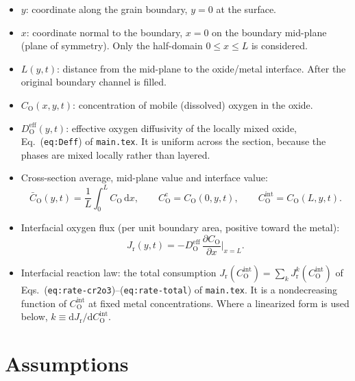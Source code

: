 \documentclass[12pt]{article}
\newcommand{\eff}{\mathrm{eff}}
\newcommand{\intf}{\mathrm{int}}
\newcommand{\Ox}{\mathrm{O}}
\newcommand{\D}{D_{\Ox}^{\eff}}
\newcommand{\Cb}{\bar{C}_{\Ox}}
\newcommand{\Cc}{C_{\Ox}^{\mathrm{c}}}
\newcommand{\Ci}{C_{\Ox}^{\intf}}
\newcommand{\Jr}{J_{\mathrm{r}}}
\newcommand{\dd}{\mathrm{d}}
\begin{document}
\begin{itemize}
  \item $y$: coordinate along the grain boundary, $y=0$ at the surface.
  \item $x$: coordinate normal to the boundary, $x=0$ on the boundary mid-plane
        (plane of symmetry). Only the half-domain $0\le x\le L$ is considered.
  \item $L(y,t)$: distance from the mid-plane to the oxide/metal interface. After the original boundary channel is filled.
  \item $C_{\Ox}(x,y,t)$: concentration of mobile (dissolved) oxygen in the oxide.
  \item $\D(y,t)$: effective oxygen diffusivity of the locally mixed oxide,
        Eq.~(\texttt{eq:Deff}) of \texttt{main.tex}. It is uniform across the section,
        because the phases are mixed locally rather than layered.
  \item Cross-section average, mid-plane value and interface value:
        \begin{equation}
        \Cb(y,t)=\frac{1}{L}\int_{0}^{L} C_{\Ox}\,\dd x,\qquad
        \Cc=C_{\Ox}(0,y,t),\qquad
        \Ci=C_{\Ox}(L,y,t).
        \end{equation}
  \item Interfacial oxygen flux (per unit boundary area, positive toward the metal):
        \begin{equation}
        \Jr(y,t)=-\D\,\frac{\partial C_{\Ox}}{\partial x}\bigg|_{x=L}.
        \label{eq:Jr-def}
        \end{equation}
  \item Interfacial reaction law: the total consumption
        $\Jr(\Ci)=\sum_k\Jr^{k}(\Ci)$ of
        Eqs.~(\texttt{eq:rate-cr2o3})--(\texttt{eq:rate-total}) of \texttt{main.tex}.
        It is a nondecreasing function of $\Ci$ at fixed metal concentrations. Where
        a linearized form is used below, $k\equiv\dd\Jr/\dd\Ci$.
\end{itemize}

\section{Assumptions}
\label{sec:assumptions}
\end{document}
